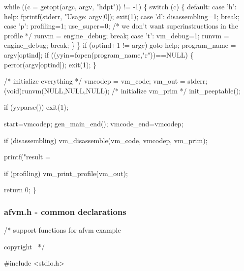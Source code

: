 \documentclass[10pt,english]{article}
\begin{document}
  while ((c = getopt(argc, argv, "hdpt")) != -1) \{
    switch (c) \{
    default:
    case 'h':
    help:
      fprintf(stderr, "Usage: %
              argv[0]);
      exit(1);
    case 'd':
      disassembling=1;
      break;
    case 'p':
      profiling=1;
      use_super=0; /* we don't want superinstructions in the profile */
      runvm = engine_debug;
      break;
    case 't':
      vm_debug=1;
      runvm = engine_debug;
      break;
    \}
  \}
  if (optind+1 != argc)
    goto help;
  program_name = argv[optind];
  if ((yyin=fopen(program_name,"r"))==NULL) \{
    perror(argv[optind]);
    exit(1);
  \}

  /* initialize everything */
  vmcodep = vm_code;
  vm_out = stderr;
  (void)runvm(NULL,NULL,NULL); /* initialize vm_prim */
  init_peeptable();

  if (yyparse())
    exit(1);

  start=vmcodep;
  gen_main_end();
  vmcode_end=vmcodep;

  if (disassembling)
    vm_disassemble(vm_code, vmcodep, vm_prim);

  printf("result = %

  if (profiling)
    vm_print_profile(vm_out);

  return 0;
\}
\nwendcode{}\nwdocspar


\subsubsection{afvm.h - common declarations}

\nwenddocs{}\endmoddef
/* support functions for afvm example

\LA{}copyright~{\nwtagstyle{}}\RA{}
*/

#include <stdio.h>
\end{document}
